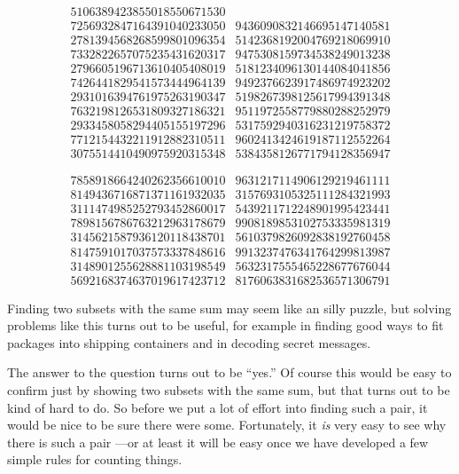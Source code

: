 {\[\begin{array}{rr}
5106389423855018550671530 \\
7256932847164391040233050 &
9436090832146695147140581 \\
2781394568268599801096354 &
5142368192004769218069910 \\
7332822657075235431620317 &
9475308159734538249013238 \\
2796605196713610405408019 &
5181234096130144084041856 \\
7426441829541573444964139 &
9492376623917486974923202 \\
2931016394761975263190347 &
5198267398125617994391348 \\
7632198126531809327186321 &
9511972558779880288252979 \\
2933458058294405155197296 &
5317592940316231219758372 \\
7712154432211912882310511 &
9602413424619187112552264 \\
3075514410490975920315348 &
5384358126771794128356947
\end{array}\]

\[\begin{array}{rr}
7858918664240262356610010 &
9631217114906129219461111 \\
8149436716871371161932035 &
3157693105325111284321993 \\
3111474985252793452860017 &
5439211712248901995423441 \\
7898156786763212963178679 &
9908189853102753335981319 \\
3145621587936120118438701 &
5610379826092838192760458 \\
8147591017037573337848616 &
9913237476341764299813987 \\
3148901255628881103198549 &
5632317555465228677676044 \\
5692168374637019617423712 &
8176063831682536571306791
\end{array}\]
}
 
Finding two subsets with the same sum may seem like an silly puzzle, but
solving problems like this turns out to be useful, for example in finding
good ways to fit packages into shipping containers and in decoding secret
messages.

The answer to the question turns out to be ``yes.''  Of course this would
be easy to confirm just by showing two subsets with the same sum, but that
turns out to be kind of hard to do.  So before we put a lot of effort into
finding such a pair, it would be nice to be sure there were some.
Fortunately, it \emph{is} very easy to see why there is such a pair ---or at
least it will be easy once we have developed a few simple rules for
counting things.


